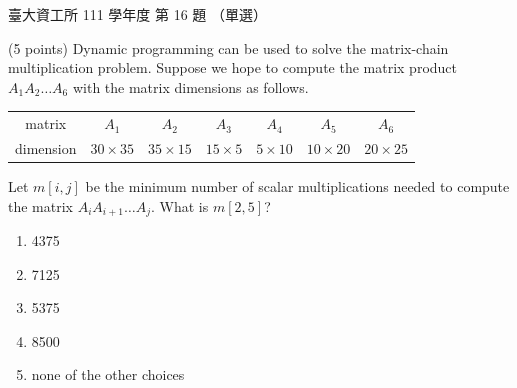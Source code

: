 \begin{pastexam}[label={px:ntu-111-dsaa-16}]{臺大資工所 111 學年度 第 16 題}
（單選）

(5 points) Dynamic programming can be used to solve the matrix-chain multiplication problem.
Suppose we hope to compute the matrix product $A_1A_2\ldots A_6$ with the matrix dimensions as
follows.
\begin{center}
\begin{tabular}{ccccccc}
matrix & $A_1$ & $A_2$ & $A_3$ & $A_4$ & $A_5$ & $A_6$\\
dimension & $30\times35$ & $35\times15$ & $15\times5$ & $5\times10$ & $10\times20$ & $20\times25$
\end{tabular}
\end{center}
Let $m[i,j]$ be the minimum number of scalar multiplications needed to compute the matrix
$A_iA_{i+1}\ldots A_j$. What is $m[2,5]$?
\begin{enumerate}[label=(\Alph*)]
\item 4375
\item 7125
\item 5375
\item 8500
\item none of the other choices
\end{enumerate}
\end{pastexam}

